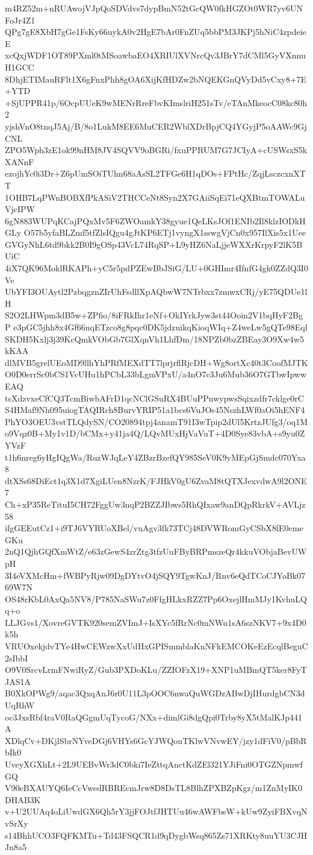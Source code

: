 m4RZ52m+nRUAwojVJpQoSDVdvs7dypBmN52tGcQW0fkHGZOt0WR7yv6UNFoJr4Z1
QPg7gE8XbH7gGe1FsKy66uykA0v2HgE7bAr0FnZUq5bbPM3JKPj5hNiC4zpdeieE
xcQxjWDF1OT89PXml0tMSoawbaEO4XRIUlXVNrcQv3JBrY7dCMl5GyVXnnuH1GCC
8DhjETIMauRFlt1X6gFnxPhh8gOA6XijKfHDZw2bNQEKGnQVyDd5vCxy8+7E+YTD
+SjUPPR41p/6OcpUUeK9wMENrRreFbvKImslriH251sTv/eTAnMkeocC08kc80h2
yjshVnO8tnqJ5Aj/B/8o1LukM8EE6MuCER2WblXDrBpjCQ4YGyjP5oAAWc9GjCNL
ZPO5Wph3zE1ok99nHM8JV4SQVV9oBGRi/fxuPPRUM7G7JCIyA+cUSWsxS5kXANnF
ezojhYc0i3Dr+Z6pUmSOiTUhn68aAsSL2TFGe6H1qDOs+FPtHc/ZqjLsczcxnXTT
1OHB7LqPWnBOBXfPkASiV2THCCeNt8Syn2X7GAiiSqEi71eQXBtmTOWALuVjcIPW
6gN883WUPqKCajPQxMv5F6ZWOamkY38gyue1QeLKsJOf1ENIb2Il8klzIODkHGLy
O57b5yfaBLZmf5tfZlsIQgu4gJtKP6ETj1vyngX1sswgVjCn0x957IlXis5x1Uee
GVGyNhL6td9bkk2B0I9gOSp43VcL74RqSP+L9yHZ6NaLjjeWXXrKrpyF2lK5BUiC
4iX7QK96MoklRKAPh+yC5r5pdPZEwBbJSiG/LU+0GHImr4IfnfG4gk0ZZdQ3I0Ve
UbYFI3OUAytl2PzbqgznZIrUhFsdllXpAQbwW7NTrbxx7zmwxCRj/yE75QDUe1lH
S2O2LHWpm3dB5w+ZPfio/8iFRkIhr1eNf+OkIYrkJyw3st44Ooin2V1bqHyF2BgP
e3pGC5jhh8x4Gf66nqETzco8g8pqc0DK5jdzuikqKioqWIq+Z4weLw5gQTe98Eql
SKDH5Kxlj3j39KcQmkVObGb7GlXqnVh1LhfDm/18NPZb0bzZBEay3O9Xw4w5kKAA
dlMVB5grelUEoMD9llhYhPRfMEXdTT7lprjrflRjcDH+Wg8ortXc40t3CoofMJTK
O0D0errSc0bCS1VcUHu1hPCbL33bLgmVPxU/a4nO7c3Ju6Mub36O7GTbwIpwwEAQ
tsXdzvxeCfCQ3TcmBiwbAFrD1qcNClGSuRX4BUuPPnwypwsSqixzdfr7cklge0rC
S4HMaf9Nh095uiogTAQIRch8BurvYRIP51a1bcs6VuJOs45NszhLWf0aOi5hENF4
PhYO3OEU3vstTLQdySN/CO20894tpj4anamT91I3wTpip2dUl5KrtzJUfg3/oq1M
o9Vqz0B+My1v1D/bCMx+y41ja4Q/LQvMUxHjVaVuT+4D0Sye83vbA+s9yu0ZYVzF
t1h6nreg6yHgIQgWa/RuzWJqLeY4ZBzrBzefQY985SeV0K9yMEpGjSmdc070Yxa8
dtXSs68DiEct1q3X1d7XgiLUen8NzrK/FJHkV0gU6ZvaM8tQTXJexvdwA9l2ONE7
Ch+xP35ReTituI5CH72FggUw3nqP2BZZJIbws5RhQIxaw9anDQpRkrkV+AVLjz58
ifgGEEutCz1+i9TJ6VYRUoXBel/vuAgv3fk73TCj48DVWRomGyCSbX8fE0emeGKu
2nQ1QjhGQfXmWtZ/e63zGewS4zrZtg3tfzUuFByBRPmszeQr4kkuVObjaBevUWpH
3I4eVXMcHm+fWBPyRjw09DgDYtvO4jSQY9TgwKnJ/Rnv6eQdTCoCJYoBk0769W7N
OS48rKbL0AxQa5NV8/P785NaSWu7z0FfgHLkxRZZ7Pp6OxejlHmMJy1KvhuLQq+o
LLJGvs1/XovreGVTK920semZVImJ+IsXYc5fRrNc0mNWu1sA6szNKV7+9x4D0k5h
VRUOxekjdvTYe4HwCEWzwXxUdHxGPISmmblaKnNFkEMCOKeEzEcqlBeguC2sIbbI
O9V0SrcvLrmFNwiRyZ/Gub3PXDoKLu/ZZIOFzX19+XNP1uMBmQT5ker8FyTJAS1A
B0XkOPWg9/aqac3QxqAnJ6r0U11L3pOOC6nwaQuWGDzABwDjIHurdgbCN3dUqRhW
oc3JxsRbf4raV0RaQGgmUqTycoG/NXx+dimlGi8dgQpi0Trby8yX5tMalKJp441A
XDlqCv+DKjlSbrNYveDGj6VHYs6GcYJWQouTKlwVNvwEY/jzy1dFiV0/pBbRbIk0
UveyXGXhLt+2L9UEBvWr3dC0bki7IeZttqAnctKdZEl321YJiFni0OTGZNpmwfGQ
V90eBXAUYQ6IeCcVwedRBREcmJrw8D8DsTL8BlhZPXBZpKgz/m1ZnMyIK0DHAB3K
v+U2UUAq4oLiUwdGX6Qh5rY3jjFOJtfJHTUu46wAWFbsW+kUw9ZyiFBXvqNvSrXy
s14BhhUCO3FQFKMTu+Td43FSQCR1d9qDygbWsq865Zs71XRKty8uuYU3CJHJn8a5
